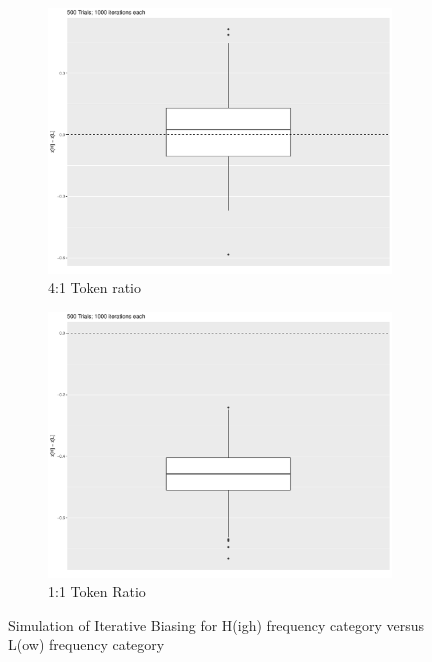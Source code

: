 \begin{figure}[H]
\begin{subfigure}[t]{.45\textwidth}
        \includegraphics[width=\linewidth]{figures/FrequencyEffect.pdf}
        \caption{\label{fig:HvL}4:1 Token ratio}
    \end{subfigure}\hfill
    \begin{subfigure}[t]{.45\textwidth}
        \includegraphics[width=\linewidth]{figures/FrequencyEffectEqNums.pdf}
        \caption{\label{fig:Freq.EqualTokens}1:1 Token Ratio}
    \end{subfigure}
\caption{Simulation of Iterative Biasing for H(igh) frequency category versus
L(ow) frequency category}
\end{figure}


